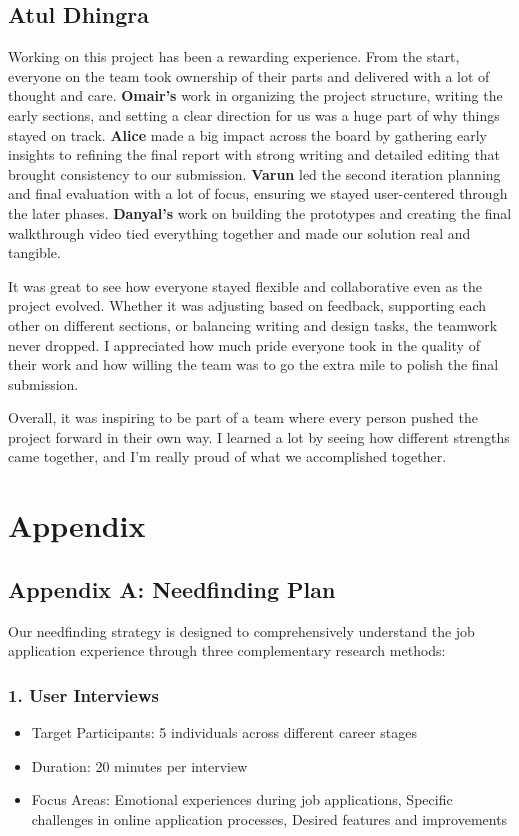\documentclass[
	letterpaper, %
]{jdf}
\begin{document}
\begin{sloppypar}
\subsection{Atul Dhingra}

Working on this project has been a rewarding experience. From the start, everyone on the team took ownership of their parts and delivered with a lot of thought and care. \textbf{Omair’s} work in organizing the project structure, writing the early sections, and setting a clear direction for us was a huge part of why things stayed on track. \textbf{Alice} made a big impact across the board by gathering early insights to refining the final report with strong writing and detailed editing that brought consistency to our submission. \textbf{Varun} led the second iteration planning and final evaluation with a lot of focus, ensuring we stayed user-centered through the later phases. \textbf{Danyal’s} work on building the prototypes and creating the final walkthrough video tied everything together and made our solution real and tangible.

It was great to see how everyone stayed flexible and collaborative even as the project evolved. Whether it was adjusting based on feedback, supporting each other on different sections, or balancing writing and design tasks, the teamwork never dropped. I appreciated how much pride everyone took in the quality of their work and how willing the team was to go the extra mile to polish the final submission.

Overall, it was inspiring to be part of a team where every person pushed the project forward in their own way. I learned a lot by seeing how different strengths came together, and I’m really proud of what we accomplished together.


\newpage

\section{Appendix}
\subsection{Appendix A: Needfinding Plan}

Our needfinding strategy is designed to comprehensively understand the job application experience through three complementary research methods:

\subsubsection{1. User Interviews}
\begin{itemize}
\item Target Participants: 5 individuals across different career stages
\item Duration: 20 minutes per interview
\item Focus Areas: Emotional experiences during job applications, Specific challenges in online application processes, Desired features and improvements
\end{itemize}
\hfill \break


\end{sloppypar}
\end{document}
